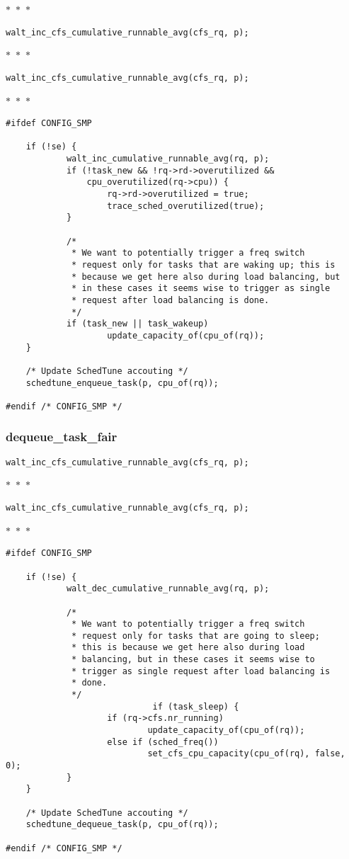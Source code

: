 \documentclass{article}
\newcommand{\divider}{{\begin{center}
  $\ast$~$\ast$~$\ast$
\end{center}}}
\begin{document}
\divider

\begin{verbatim}
walt_inc_cfs_cumulative_runnable_avg(cfs_rq, p);
\end{verbatim}
\divider
\begin{verbatim}
walt_inc_cfs_cumulative_runnable_avg(cfs_rq, p);
\end{verbatim}
\divider
\begin{verbatim}
#ifdef CONFIG_SMP

    if (!se) {
            walt_inc_cumulative_runnable_avg(rq, p);
            if (!task_new && !rq->rd->overutilized &&
                cpu_overutilized(rq->cpu)) {
                    rq->rd->overutilized = true;
                    trace_sched_overutilized(true);
            }

            /*
             * We want to potentially trigger a freq switch
             * request only for tasks that are waking up; this is
             * because we get here also during load balancing, but
             * in these cases it seems wise to trigger as single
             * request after load balancing is done.
             */
            if (task_new || task_wakeup)
                    update_capacity_of(cpu_of(rq));
    }
    
    /* Update SchedTune accouting */
    schedtune_enqueue_task(p, cpu_of(rq));

#endif /* CONFIG_SMP */
\end{verbatim}

\subsubsection{dequeue\_task\_fair}

\begin{verbatim}
walt_inc_cfs_cumulative_runnable_avg(cfs_rq, p);
\end{verbatim}
\divider
\begin{verbatim}
walt_inc_cfs_cumulative_runnable_avg(cfs_rq, p);
\end{verbatim}
\divider
\begin{verbatim}
#ifdef CONFIG_SMP

    if (!se) {
            walt_dec_cumulative_runnable_avg(rq, p);

            /*
             * We want to potentially trigger a freq switch
             * request only for tasks that are going to sleep;
             * this is because we get here also during load
             * balancing, but in these cases it seems wise to
             * trigger as single request after load balancing is
             * done.
             */
                             if (task_sleep) {
                    if (rq->cfs.nr_running)
                            update_capacity_of(cpu_of(rq));
                    else if (sched_freq())
                            set_cfs_cpu_capacity(cpu_of(rq), false, 0);
            }
    }

    /* Update SchedTune accouting */
    schedtune_dequeue_task(p, cpu_of(rq));

#endif /* CONFIG_SMP */
\end{verbatim}
\end{document}

